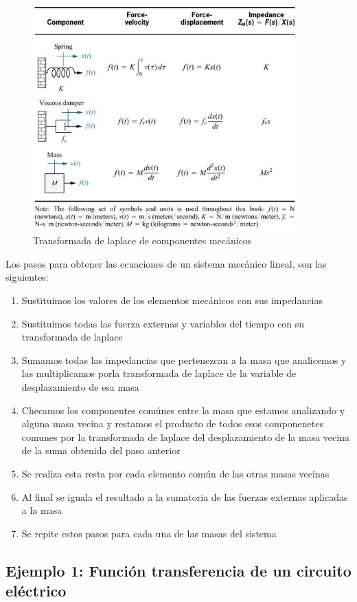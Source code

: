 \documentclass[12pt]{book}
\theoremstyle{definition}
\theoremstyle{remark}
\theoremstyle{plain}
\begin{document}
\begin{figure}
\centering
\includegraphics[width=4in]{mecanica.jpg}
\caption{Transformada de laplace de componentes mecánicos}
\label{fig101}
\end{figure}

Los pasos para obtener las ecuaciones de un sistema mecánico lineal, son las siguientes:
\begin{enumerate}
\item Sustituimos los valores de los elementos mecánicos con sus impedancias
\item Sustituimos todas las fuerza externas y variables del tiempo con su transformada de laplace
\item Sumamos todas las impedancias que pertenezcan a la masa que analicemos y las multiplicamos porla transformada de laplace de la variable de desplazamiento de esa masa
\item Checamos los componentes comúnes entre la masa que estamos analizando y alguna masa vecina y restamos el producto de todos esos componenetes comunes por la transformada de laplace del desplazamiento de la masa vecina de la suma obtenida del paso anterior
\item Se realiza esta resta por cada elemento común de las otras masas vecinas
\item Al final se iguala el resultado a la sumatoria de las  fuerzas externas aplicadas a la masa
\item Se repite estos pasos para cada una de las masas del sistema
\end{enumerate}

\subsection{Ejemplo 1: Función transferencia de un circuito eléctrico}
\end{document}
